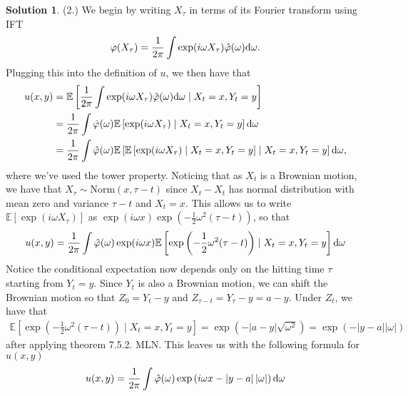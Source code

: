 \documentclass[12pt]{article}
\newcommand{\abs}[1]{ \left| #1 \right| }
\newcommand{\Expect}{\mathbb{E}}
\renewcommand{\phi}{\varphi}
\theoremstyle{definition}
\newtheorem{sol}{Solution}
\theoremstyle{remark}
\def\d{{\rm d}}
\begin{document}
\begin{sol}
(2.) We begin by writing $X_{\tau}$ in terms of its Fourier transform using IFT
 \begin{align*}
     \phi(X_{\tau}) = \frac{1}{2\pi} \int \exp(i \omega X_{\tau}) \hat{\phi}(\omega) \d \omega.
\end{align*}
Plugging this into the definition of $u$, we then have that
\begin{align*}
    u(x, y) &= \Expect\left[   \frac{1}{2\pi} \int \exp(i \omega X_{\tau}) \hat{\phi}(\omega) \d \omega \mid X_{t} = x, Y_{t} = y     \right] \\
            &= \frac{1}{2 \pi} \int \hat{\phi}(\omega)  \Expect\left[ \exp(i \omega X_{\tau})   \mid X_{t} = x, Y_{t} = y  \right] \d \omega\\
            &= \frac{1}{2 \pi} \int \hat{\phi}(\omega)  \Expect\left[ \Expect\left[ \exp(i \omega X_{\tau})   \mid X_{t} = x, Y_{t} = y  \right]  \mid X_{t} = x, Y_{t} = y  \right] \d \omega,
\end{align*}
where we've used the tower property. Noticing that as $X_{t}$ is a Brownian motion, we have that $X_{\tau} \sim \text{Norm}(x, \tau - t)$ since $X_{t} - X_{t}$ has normal distribution with mean zero and variance $\tau - t$ and $X_{t} = x$. This allows us to write $\Expect[ \exp(i\omega X_{\tau}) ]$ as $\exp(i \omega x) \exp(- \frac{1}{2} \omega^{2} (\tau - t))$, so that
\begin{align*}
    u(x,y) &= \frac{1}{2 \pi} \int \hat{\phi}(\omega) \exp(i \omega x) \Expect\left[ \exp\left(- \frac{1}{2} \omega^{2} (\tau - t)   \right)\mid X_{t} = x, Y_{t} = y  \right] \d \omega\\
\end{align*}
Notice the conditional expectation now depends only on the hitting time $\tau$ starting from $Y_{t} = y$. Since $Y_{t}$ is also a Brownian motion, we can shift the Brownian motion so that $Z_{0} = Y_{t} - y$ and $Z_{\tau - t} = Y_{\tau} - y = a - y$. Under $Z_{t}$, we have that
\begin{align*}
    \Expect\left[ \exp\left(- \frac{1}{2} \omega^{2}(\tau - t  ) \right)\mid X_{t} = x, Y_{t} = y  \right]  = \exp\left(-\abs{a - y} \sqrt{\omega^{2}}\right) = \exp(- \abs{y - a} \abs{\omega})
\end{align*}
after applying theorem 7.5.2. MLN. This leaves us with the following formula for $u(x,y)$
 \begin{align*}
     u(x, y ) &= \frac{1}{2\pi} \int \hat{\phi}(\omega) \exp\left(i\omega x - \abs{y - a} \abs{\omega}\right)\d \omega\\

\end{align*}
\end{sol}
\end{document}
